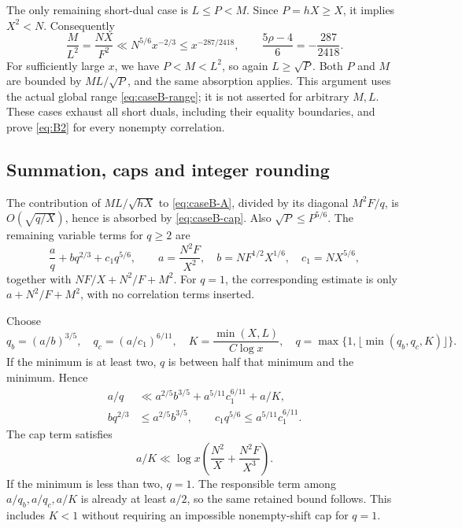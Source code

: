 \documentclass[11pt,a4paper]{article}
\numberwithin{equation}{section}
\theoremstyle{remark}
\begin{document}
The only remaining short-dual case is $L\le P<M$. Since $P=hX\ge X$,
it implies $X^2<N$. Consequently
\begin{equation}\label{eq:B-short-margin}
 \frac{M}{L^2}=\frac{NX}{F^2}
 \ll N^{5/6}x^{-2/3}
 \le x^{-287/2418},\qquad
 \frac{5\rho-4}{6}=-\frac{287}{2418}.
\end{equation}
For sufficiently large $x$, we have $P<M<L^2$, so again
$L\ge\sqrt P$. Both $P$ and $M$ are bounded by $ML/\sqrt P$, and the
same absorption applies. This argument uses the actual global range
\eqref{eq:caseB-range}; it is not asserted for arbitrary $M,L$.
These cases exhaust all short duals, including their equality boundaries,
and prove \eqref{eq:B2} for every nonempty correlation.

\subsection{Summation, caps and integer rounding}
The contribution of $ML/\sqrt{hX}$ to \eqref{eq:caseB-A}, divided by its
diagonal $M^2F/q$, is $O(\sqrt{q/X})$, hence is absorbed by
\eqref{eq:caseB-cap}. Also $\sqrt P\le P^{5/6}$. The remaining variable
terms for $q\ge2$ are
\begin{equation}\label{eq:B-balance}
 \frac aq+bq^{2/3}+c_1q^{5/6},\qquad
 a=\frac{N^2F}{X^2},\quad b=NF^{1/2}X^{1/6},\quad c_1=NX^{5/6},
\end{equation}
together with $NF/X+N^2/F+M^2$. For $q=1$, the corresponding estimate is
only $a+N^2/F+M^2$, with no correlation terms inserted.

Choose
\begin{equation}\label{eq:B-q}
 q_b=(a/b)^{3/5},\quad q_c=(a/c_1)^{6/11},\quad
 K=\frac{\min(X,L)}{C\log x},\quad
 q=\max\{1,\lfloor\min(q_b,q_c,K)\rfloor\}.
\end{equation}
If the minimum is at least two, $q$ is between half that minimum and the
minimum. Hence
\begin{align*}
 a/q&\ll a^{2/5}b^{3/5}+a^{5/11}c_1^{6/11}+a/K,\\
 bq^{2/3}&\le a^{2/5}b^{3/5},\qquad
 c_1q^{5/6}\le a^{5/11}c_1^{6/11}.
\end{align*}
The cap term satisfies
\[
 a/K\ll\log x\left(\frac{N^2}{X}+\frac{N^2F}{X^3}\right).
\]
If the minimum is less than two, $q=1$. The responsible term among
$a/q_b,a/q_c,a/K$ is already at least $a/2$, so the same retained bound
follows. This includes $K<1$ without requiring an impossible nonempty-shift
cap for $q=1$.
\end{document}

